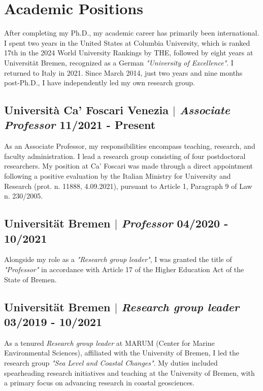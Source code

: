 \documentclass[11pt]{article}
\begin{document}
\section{Academic Positions}
{\normalfont After completing my Ph.D., my academic career has primarily been international. I spent two years in the United States at Columbia University, which is ranked 17th in the 2024 World University Rankings by THE, followed by eight years at Universität Bremen, recognized as a German \textit{"University of Excellence"}. I returned to Italy in 2021. Since March 2014, just two years and nine months post-Ph.D., I have independently led my own research group.}\\
\bigskip
\subsection{Università Ca' Foscari Venezia $|$ {\normalfont\textit{Associate Professor}} \hfill 11/2021 - Present}
{\footnotesize As an Associate Professor, my responsibilities encompass teaching, research, and faculty administration. I lead a research group consisting of four postdoctoral researchers. My position at Ca' Foscari was made through a direct appointment following a positive evaluation by the Italian Ministry for University and Research (prot. n. 11888, 4.09.2021), pursuant to Article 1, Paragraph 9 of Law n. 230/2005.}
\bigskip

\subsection{Universität Bremen $|$ {\normalfont\textit{Professor}} \hfill 04/2020 - 10/2021}
{\footnotesize Alongside my role as a \textit{"Research group leader"}, I was granted the title of \textit{"Professor"} in accordance with Article 17 of the Higher Education Act of the State of Bremen.}
\bigskip

\subsection{Universität Bremen $|$ {\normalfont\textit{Research group leader}} \hfill 03/2019 - 10/2021}
{\footnotesize As a tenured \textit{Research group leader} at MARUM (Center for Marine Environmental Sciences), affiliated with the University of Bremen, I led the research group \textit{"Sea Level and Coastal Changes"}. My duties included spearheading research initiatives and teaching at the University of Bremen, with a primary focus on advancing research in coastal geosciences.}
\bigskip
\end{document}

